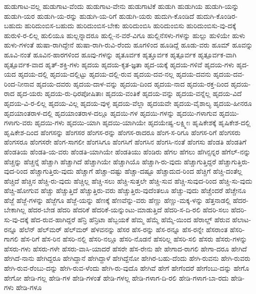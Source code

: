 {ಹುಡುಗಾಟ-ವಲ್ಲ
ಹುಡುಗಾಟ-ವೆಂದು
ಹುಡುಗಾಟ-ವೇನು
ಹುಡುಗಾಟಿಕೆ
ಹುಡುಗಿ
ಹುಡುಗಿಯ
ಹುಡುಗಿ-ಯನ್ನು
ಹುಡುಗಿ-ಯರ
ಹುಡುಗಿ-ಯ-ರನ್ನು
ಹುಡುಗಿ-ಯ-ರಿಗೆ
ಹುಡುಗಿ-ಯರು
ಹುದುಗಿ-ಕೊಂಡಿದೆ
ಹುದುಗಿ-ಕೊಂಡಿರ-ಬಹುದು
ಹುರಿದುಂಬಿಸ-ಬಹುದು
ಹುರಿದುಂಬಿಸ-ಬೇಕು
ಹುರಿದುಂಬಿಸಿ
ಹುರಿದುಂಬಿಸು
ಹುರಿದುಂಬಿಸು-ವು-ದಕ್ಕೆ
ಹುರುಳಿ-ರ-ಲಿಲ್ಲ
ಹುಲಿಯೂ
ಹುಲ್ಲನ್ನಾದರೂ
ಹುಲ್ಲಿ-ನ-ವರೆ-ವಿಗೂ
ಹುಲ್ಲಿನೆಸಳು-ಗಳನ್ನು
ಹುಲ್ಲು
ಹುಳಿಯೇ
ಹುಳು
ಹುಳು-ಗಳಂತೆ
ಹುಷಾ-ರಾಗಿದ್ದೇನೆ
ಹುಷಾ-ರಾಗಿ-ರುವಿ-ರೆಂದು
ಹೂಗಳಿಂದ
ಹೂಡಿದ್ದೆ
ಹೂಡು-ವರು
ಹೂಮ್
ಹೂವನ್ನು
ಹೂವಿ-ನಂತೆ
ಹೂವಿನ-ಹಾರಗಳಿಂದ
ಹೂವು-ಗಳನ್ನು
ಹೃತೂರ್ವಕ
ಹೃತ್ತೂರ್ವಕ
ಹೃತ್ಪೂರ್ವಕ
ಹೃತ್ಪೂರ್ವಕ-ವಾಗಿ
ಹೃತ್ಪೂರ್ವಕ-ವಾದ
ಹೃತ್‌-ಶಕ್ತಿ-ಗಳು
ಹೃದಯ
ಹೃದಯ-ಕೃತ-ಜ್ಞತಾ
ಹೃದ-ಯಕ್ಕೆ
ಹೃದಯ-ಗಳಿವೆ
ಹೃದಯ-ಗಳು
ಹೃದ-ಯದ
ಹೃದಯ-ದಲ್ಲಿ
ಹೃದಯ-ದಲ್ಲಿಟ್ಟು
ಹೃದಯ-ದಲ್ಲಿ-ರುವ
ಹೃದಯ-ದವ-ನಲ್ಲ
ಹೃದಯ-ದವನು
ಹೃದಯ-ದವ-ರಿಂದ-ನೀನಾವ
ಹೃದಯ-ದವರು
ಹೃದಯ-ದಾಳ-ವನ್ನು
ಹೃದಯ-ದಿಂದ
ಹೃದಯ-ನಾದ
ಹೃದಯ-ರಕ್ತ-ದಿಂದ
ಹೃದಯ-ರಾದ
ಹೃದ-ಯರು
ಹೃದಯ-ರು-ಧಿರಪೋಷಿತಾಃ
ಹೃದಯ-ವಂತಿಕೆ
ಹೃದಯ-ವನ್ನು
ಹೃದಯ-ವನ್ನೆಲ್ಲ
ಹೃದಯ-ವಿದೆ
ಹೃದಯ-ವಿ-ರ-ಲಿಲ್ಲ
ಹೃದಯ-ವಿಲ್ಲ
ಹೃದಯ-ವುಳ್ಳ
ಹೃದಯ-ವೆಲ್ಲಾ
ಹೃದಯವೇ
ಹೃದಯ-ವೈಶಾಲ್ಯ
ಹೃದಯ-ಹೀನರೂ
ಹೃದಯಾಂತರಾಳ-ದಲ್ಲಿ
ಹೃದಯಾಂತರಾಳ-ದಲ್ಲೂ
ಹೃದಯಿ-ಗಳ
ಹೃದಯಿ-ಗಳನ್ನು
ಹೃದಯಿ-ಗಳಾಗುವ
ಹೃದಯಿ-ಗಳಾಗು-ವರು
ಹೃದಯಿ-ಗಳು
ಹೃದಯಿ-ಯಾಗಿ
ಹೃದಯಿ-ಯಾಗಿಯೇ
ಹೃದಯೇಷ್ವ-ಲಕ್ಷ್ಮೀಃ
ಹೃಷಿಕೇಶಕ್ಕೆ
ಹೃಷಿಕೇಶ-ದಲ್ಲಿ
ಹೃಷಿಕೇಶ-ದಿಂದ
ಹೆಂಗಸನ್ನು
ಹೆಂಗಸರ
ಹೆಂಗಸ-ರನ್ನು
ಹೆಂಗಸ-ರಾದರೂ
ಹೆಂಗ-ಸ-ರಿಗೂ
ಹೆಂಗಸ-ರಿಗೆ
ಹೆಂಗಸರು
ಹೆಂಗಸರೂ
ಹೆಂಗಸರೇ
ಹೆಂಗ-ಸಾಗಲೀ
ಹೆಂಗಸಿಗೂ
ಹೆಂಗಸಿಗೆ
ಹೆಂಗಸಿನ
ಹೆಂಗಸಿ-ನಂತೆ
ಹೆಂಗಸು
ಹೆಂಡತಿ
ಹೆಂಡತಿಗೆ
ಹೆಂಡತಿಯ
ಹೆಂಡತಿ-ಯ-ವರು
ಹೆಂಡತಿ-ಯಾಗಿಯೇ
ಹೆಂಡತಿಯು
ಹೆಂಡಿರು
ಹೆಗಲ
ಹೆಗಲು
ಹೆಗಿನ್ಸನ್ನರ
ಹೆಗೆಲ್‌-ನನ್ನು
ಹೆಚ್ಚನ್ನು
ಹೆಚ್ಚನ್ನೆ
ಹೆಚ್ಚಾಗಿ
ಹೆಚ್ಚಾಗಿದೆ
ಹೆಚ್ಚಾಗಿಯೇ
ಹೆಚ್ಚಾಗಿಯೊ
ಹೆಚ್ಚಾಗಿ-ರು-ವುದು
ಹೆಚ್ಚಾಗುತ್ತಿದ್ದರೆ
ಹೆಚ್ಚಾಗುತ್ತಿರು-ವುದ-ರಿಂದ
ಹೆಚ್ಚಾಗುತ್ತಿರು-ವುದು
ಹೆಚ್ಚಾಗೆ
ಹೆಚ್ಚಾ-ದಷ್ಟು
ಹೆಚ್ಚಾ-ದಷ್ಟೂ
ಹೆಚ್ಚಾದುದ-ರಿಂದ
ಹೆಚ್ಚಿಗೆ
ಹೆಚ್ಚಿ-ದಂತೆಲ್ಲ
ಹೆಚ್ಚಿದೆ
ಹೆಚ್ಚಿನ
ಹೆಚ್ಚಿ-ರು-ವುದು
ಹೆಚ್ಚಿಲ್ಲ
ಹೆಚ್ಚಿ-ಸಲು
ಹೆಚ್ಚಿ-ಸುತ್ತಲೇ
ಹೆಚ್ಚಿ-ಸುವ
ಹೆಚ್ಚಿ-ಸುವುದ-ರಿಂದ
ಹೆಚ್ಚಿ-ಸು-ವುದು
ಹೆಚ್ಚಿ-ಹೋಗುವ
ಹೆಚ್ಚು
ಹೆಚ್ಚುತ್ತಿದೆ
ಹೆಚ್ಚುತ್ತಿರು-ವರು
ಹೆಚ್ಚುತ್ತಿರು-ವುದೆಂತಲೂ
ಹೆಚ್ಚು-ವುದು
ಹೆಚ್ಚೆಂದರೆ
ಹೆಚ್ಚೇನೂ
ಹೆಜ್ಜೆ
ಹೆಜ್ಜೆ-ಗಳನ್ನು
ಹೆಜ್ಜೆಗೂ
ಹೆಜ್ಜೆ-ಯನ್ನು
ಹೆಣಕ್ಕೆ
ಹೆಣವೆನ್ನು-ವರು
ಹೆಣ್ಣು
ಹೆಣ್ಣು-ಮಕ್ಕ-ಳನ್ನು
ಹೆತ್ತನಾಡಲ್ಲಿ
ಹೆದರ-ಬೇಕಾಗಿಲ್ಲ
ಹೆದರ-ಬೇಡ
ಹೆದರಿ
ಹೆದರಿಕೆ
ಹೆದರಿಕೆ-ಯನ್ನುಂಟು-ಮಾಡುತ್ತಿದೆ
ಹೆದರಿ-ಸ-ದಿ-ರಲಿ
ಹೆದರಿ-ಸಲು
ಹೆದರಿ-ಸು-ವು-ದಕ್ಕೆ
ಹೆದ-ರುವ-ಹಾಗಿದ್ದರೆ
ಹೆನ್ರಿ
ಹೆನ್ರಿಟಾ
ಹೆಬ್ಬಯಕೆ
ಹೆಮ್ಮ
ಹೆಮ್ಮೆ
ಹೆಮ್ಮೆ-ಯಿಂದ
ಹೆರಾಲ್ಡ್
ಹೆರುವ
ಹೆಲಾಟ-ರನ್ನೂ
ಹೆಲೆನ್
ಹೆಲ್‌ಮರ್‌
ಹೆಲ್‌ಮ‌ರ್
ಹೆಳವನನ್ನು
ಹೆಸರ
ಹೆಸ-ರನ್ನು
ಹೆಸ-ರನ್ನೂ
ಹೆಸ-ರನ್ನೇ
ಹೆಸರಾಂತ
ಹೆಸರಿ-ಗಾಗಲಿ
ಹೆಸ-ರಿಗೆ
ಹೆಸ-ರಿನ
ಹೆಸರಿ-ನಲ್ಲಿ
ಹೆಸರಿ-ನಲ್ಲೂ
ಹೆಸರಿ-ನೊಡನೆ
ಹೆಸರಿಲ್ಲ
ಹೆಸರಿ-ಸಲಿ
ಹೆಸರು
ಹೆಸರು-ಗಳನ್ನು
ಹೆಸರು-ಗಳು
ಹೆಸರು-ಗಳೇ
ಹೆಸರು-ವಾಸಿ-ಯಾದರೆ
ಹೆಸರೇ
ಹೆಸ-ರೇನು
ಹೇ
ಹೇಗಾದ-ರಾಗಲಿ
ಹೇಗಾ-ದರೂ
ಹೇಗಿದೆ
ಹೇಗಿದೆ-ನಾನು
ಹೇಗಿದ್ದರೂ
ಹೇಗಿದ್ದಾನೆ
ಹೇಗಿದ್ದಾಳೆ
ಹೇಗಿದ್ದೆನೋ
ಹೇಗಿರ-ಬಹು-ದೆಂದು
ಹೇಗಿ-ರುವನು
ಹೇಗಿ-ರುವರು
ಹೇಗಿ-ರುವ-ರೆಂಬು-ದನ್ನು
ಹೇಗಿ-ರುವ-ಳೆಂದು
ಹೇಗಿ-ರು-ವುದೊ
ಹೇಗಿವೆ
ಹೇಗೆ
ಹೇಗೆಂದರೆ
ಹೇಗೆಂಬು-ದನ್ನು
ಹೇಗೊ
ಹೇಗೋ
ಹೇಡಿ-ಗಲ್ಲ
ಹೇಡಿ-ಗಳ
ಹೇಡಿ-ಗಳಂತೆ
ಹೇಡಿ-ಗಳಲ್ಲ
ಹೇಡಿ-ಗಳಾಗ-ದಿ-ರಲಿ
ಹೇಡಿ-ಗಳಾಗ-ಬಾ-ರದು
ಹೇಡಿ-ಗಳು
ಹೇಡಿ-ಗಳೂ
}
